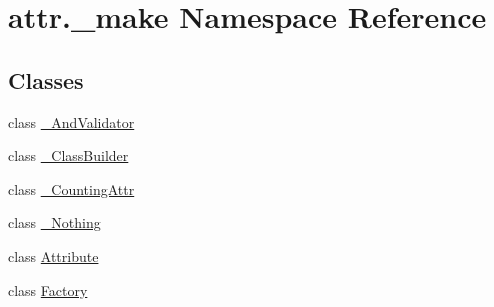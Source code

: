 \hypertarget{namespaceattr_1_1__make}{}\section{attr.\+\_\+make Namespace Reference}
\label{namespaceattr_1_1__make}
\subsection*{Classes}
\begin{DoxyCompactItemize}
\item 
class \hyperlink{classattr_1_1__make_1_1___and_validator}{\+\_\+\+And\+Validator}
\item 
class \hyperlink{classattr_1_1__make_1_1___class_builder}{\+\_\+\+Class\+Builder}
\item 
class \hyperlink{classattr_1_1__make_1_1___counting_attr}{\+\_\+\+Counting\+Attr}
\item 
class \hyperlink{classattr_1_1__make_1_1___nothing}{\+\_\+\+Nothing}
\item 
class \hyperlink{classattr_1_1__make_1_1_attribute}{Attribute}
\item 
class \hyperlink{classattr_1_1__make_1_1_factory}{Factory}
\end{DoxyCompactItemize}
